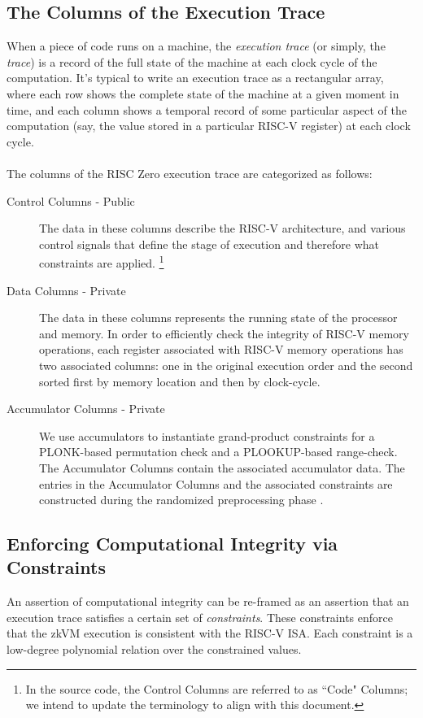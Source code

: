 \documentclass[10pt,letterpaper,titlepage]{article}
\theoremstyle{definition}
\begin{document}
\subsection{The Columns of the Execution Trace}
\label{trace}
When a piece of code runs on a machine, the \textit{execution trace} (or simply, the \textit{trace}) is a record of the full state of the machine at each clock cycle of the computation.
It's typical to write an execution trace as a rectangular array, where each row shows the complete state of the machine at a given moment in time, and each column shows a temporal record of some particular aspect of the computation (say, the value stored in a particular RISC-V register) at each clock cycle. \\
\\
The columns of the RISC Zero execution trace are categorized as follows:
\begin{description}
  \item[Control Columns - Public] The data in these columns describe the RISC-V architecture, and various control signals that define the stage of execution and therefore what constraints are applied.
  \footnote{In the source code, the Control Columns are referred to as ``Code" Columns; we intend to update the terminology to align with this document.} 
  \item[Data Columns - Private] The data in these columns represents the running state of the processor and memory. 
  In order to efficiently check the integrity of RISC-V memory operations, each register associated with RISC-V memory operations has two associated columns: one in the original execution order and the second sorted first by memory location and then by clock-cycle. 
  \item[Accumulator Columns - Private] We use accumulators to instantiate grand-product constraints for a PLONK-based permutation check and a PLOOKUP-based range-check. 
  The Accumulator Columns contain the associated accumulator data. 
  The entries in the Accumulator Columns and the associated constraints are constructed during the randomized preprocessing phase \cite{plonk, plookup, RAP}. \\
\end{description}

\subsection{Enforcing Computational Integrity via Constraints}
An assertion of computational integrity can be re-framed as an assertion that an execution trace satisfies a certain set of \textit{constraints}.
These constraints enforce that the zkVM execution is consistent with the RISC-V ISA.
Each constraint is a low-degree polynomial relation over the constrained values.
\end{document}
